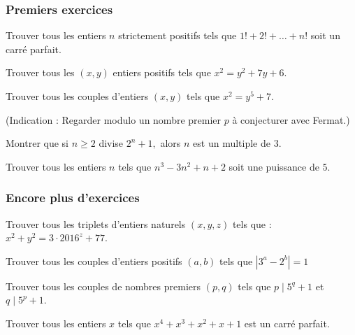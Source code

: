 
\subsubsection{Premiers exercices}


\begin{exo}
Trouver tous les entiers $n$ strictement positifs tels que $1!+2!+\ldots+n!$ soit un carré parfait.
\end{exo}

\begin{exo}
Trouver tous les $(x,y)$ entiers positifs tels que $x^2=y^2+7y+6$.
\end{exo}

\begin{exo}
Trouver tous les couples d'entiers $(x,y)$ tels que $x^2=y^5+7$.

(Indication : Regarder modulo un nombre premier $p$ à conjecturer avec Fermat.)
\end{exo}

\begin{exo}
Montrer que si $n\ge2$ divise $2^n+1,$ alors $n$ est un multiple de $3$.
\end{exo}

\begin{exo}
Trouver tous les entiers $n$ tels que $n^3-3n^2+n+2$ soit une puissance de $5$.
\end{exo}

\subsubsection{Encore plus d'exercices}


\begin{exo}
Trouver tous les triplets d’entiers naturels $(x,y,z)$ tels que :
$x^2+y^2=3\cdot2016^z+77$.
\end{exo}

\begin{exo}
Trouver tous les couples d'entiers positifs $(a,b)$ tels que $|3^a-2^b|=1$
\end{exo}


\begin{exo}
Trouver tous les couples de nombres premiers $(p,q)$ tels que $p\mid5^q+1$ et $q\mid5^p+1$.
\end{exo}


\begin{exo}
Trouver tous les entiers $x$ tels que $x^4+x^3+x^2+x+1$ est un carré parfait.
\end{exo}


